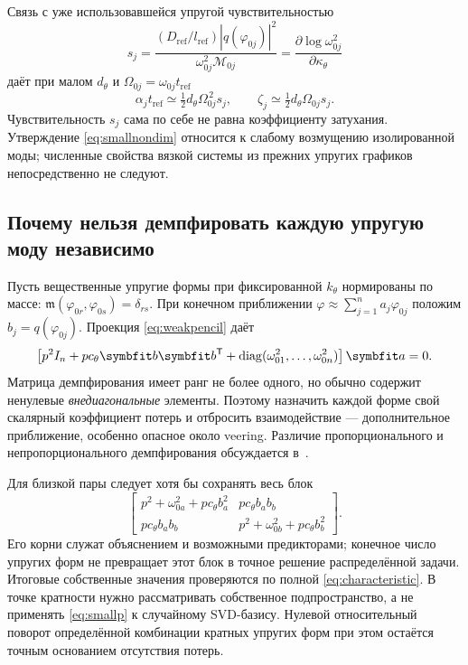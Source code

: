 \documentclass[11pt,a4paper]{article}
\numberwithin{equation}{section}
\newcommand{\kth}{k_\theta}
\newcommand{\cth}{c_\theta}
\newcommand{\refsub}{\mathrm{ref}}
\newcommand{\tref}{t_{\refsub}}
\newcommand{\lref}{l_{\refsub}}
\newcommand{\Dref}{D_{\refsub}}
\newcommand{\abs}[1]{\left|#1\right|}
\DeclareMathOperator{\diag}{diag}
\begin{document}
Связь с уже использовавшейся упругой чувствительностью
\begin{equation}
 s_j=\frac{(\Dref/\lref)\abs{q(\varphi_{0j})}^2}
 {\omega_{0j}^2\mathcal M_{0j}}
 =\frac{\partial\log\omega_{0j}^2}{\partial\kappa_\theta}
 \label{eq:sensitivity}
\end{equation}
даёт при малом $d_\theta$ и $\Omega_{0j}=\omega_{0j}\tref$
\begin{equation}
 \alpha_j\tref\simeq\tfrac12d_\theta\Omega_{0j}^{\,2}s_j,
 \qquad
 \zeta_j\simeq\tfrac12d_\theta\Omega_{0j}s_j.
 \label{eq:smallnondim}
\end{equation}
Чувствительность $s_j$ сама по себе не равна коэффициенту затухания.
Утверждение \eqref{eq:smallnondim} относится к слабому возмущению
изолированной моды; численные свойства вязкой системы из прежних
упругих графиков непосредственно не следуют.

\subsection{Почему нельзя демпфировать каждую упругую моду независимо}

Пусть вещественные упругие формы при фиксированной $\kth$ нормированы
по массе: $\mathfrak m(\varphi_{0r},\varphi_{0s})=\delta_{rs}$.
При конечном приближении
$\varphi\approx\sum_{j=1}^{n} a_j\varphi_{0j}$ положим
$b_j=q(\varphi_{0j})$. Проекция \eqref{eq:weakpencil} даёт
\begin{equation}
 \left[p^2 I_n+p\cth\symbfit b\symbfit b^{\mathsf T}
 +\diag(\omega_{01}^2,\ldots,\omega_{0n}^2)\right]\symbfit a=0.
 \label{eq:modalqep}
\end{equation}
Матрица демпфирования имеет ранг не более одного, но обычно содержит
ненулевые \emph{внедиагональные} элементы. Поэтому назначить каждой форме
свой скалярный коэффициент потерь и отбросить взаимодействие ---
дополнительное приближение, особенно опасное около veering.
Различие пропорционального и непропорционального демпфирования
обсуждается в~\cite{tisseur2001}.

Для близкой пары следует хотя бы сохранять весь блок
\begin{equation}
 \begin{bmatrix}
 p^2+\omega_{0a}^2+p\cth b_a^2 & p\cth b_ab_b\\
 p\cth b_ab_b & p^2+\omega_{0b}^2+p\cth b_b^2
 \end{bmatrix}.
 \label{eq:twomode}
\end{equation}
Его корни служат объяснением и возможными предикторами; конечное число
упругих форм не превращает этот блок в точное решение распределённой
задачи. Итоговые собственные значения проверяются по полной
\eqref{eq:characteristic}. В точке кратности нужно рассматривать
собственное подпространство, а не применять \eqref{eq:smallp} к случайному
SVD-базису. Нулевой относительный поворот определённой комбинации
кратных упругих форм при этом остаётся точным основанием отсутствия потерь.
\end{document}
